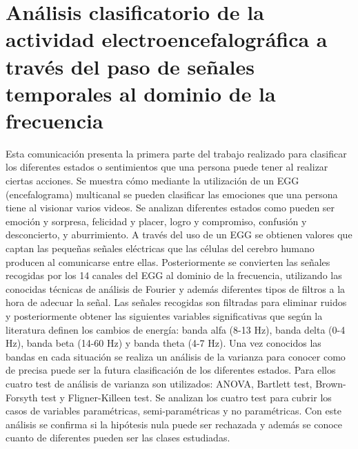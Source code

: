 \chapter{Análisis clasificatorio de la actividad electroencefalográfica a través del paso de señales temporales al dominio de la frecuencia}



\index[inst]{}
\index[inst]{}
\index[inst]{}

Esta comunicación presenta la primera parte del trabajo realizado para clasificar los diferentes estados o sentimientos que una persona puede tener al realizar ciertas acciones. Se muestra cómo mediante la utilización de un EGG (encefalograma) multicanal se pueden clasificar las emociones que una persona tiene al visionar varios videos. Se analizan diferentes estados como pueden ser emoción y sorpresa, felicidad y placer, logro y compromiso, confusión y desconcierto, y aburrimiento. A través del uso de un EGG se obtienen valores que captan las pequeñas señales eléctricas que las células del cerebro humano producen al comunicarse entre ellas. Posteriormente se convierten las señales recogidas por los 14 canales del EGG al dominio de la frecuencia, utilizando las conocidas técnicas de análisis de Fourier y además diferentes tipos de filtros a la hora de adecuar la señal. Las señales recogidas son filtradas para eliminar ruidos y posteriormente obtener las siguientes variables significativas que según la literatura definen los cambios de energía: banda alfa (8-13 Hz), banda delta (0-4 Hz), banda beta (14-60 Hz) y banda theta (4-7 Hz). Una vez conocidos las bandas en cada situación se realiza un análisis de la varianza para conocer como de precisa puede ser la futura clasificación de los diferentes estados. Para ellos cuatro test de análisis de varianza son utilizados: ANOVA, Bartlett test, Brown-Forsyth test y Fligner-Killeen test. Se analizan los cuatro test para cubrir los casos de variables paramétricas, semi-paramétricas y no paramétricas. Con este análisis se confirma si la hipótesis nula puede ser rechazada y además se conoce cuanto de diferentes pueden ser las clases estudiadas.

%

%
